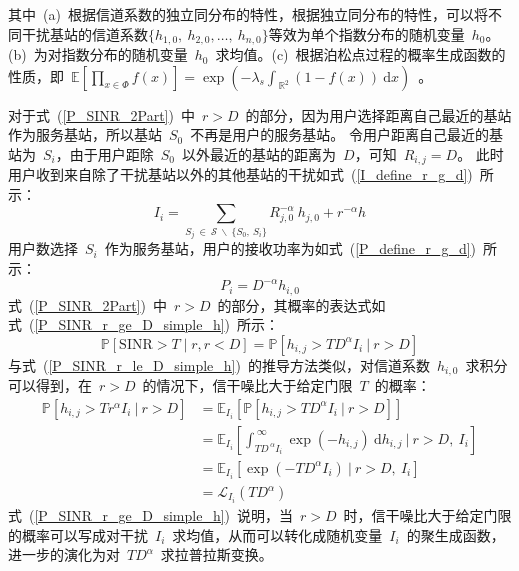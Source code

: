 其中~(a)~根据信道系数的独立同分布的特性，根据独立同分布的特性，可以将不同干扰基站的信道系数$\{h_{1,0},~h_{2,0},\dots,~h_{n,0}\}$等效为单个指数分布的随机变量~$h_0$。
(b)~为对指数分布的随机变量~$h_0$~求均值。(c)~根据泊松点过程的概率生成函数的性质，即~$\mathbb{E}\left[\prod\nolimits_{x\in\Phi}f(x)\right]=\exp(-\lambda_s\int_{~\mathbb{R}^2}(1-f(x))~\mathrm{d}x)$~。

对于式~(\ref{P_SINR_2Part})~中~$r > D$~的部分，因为用户选择距离自己最近的基站作为服务基站，所以基站~$S_0$~不再是用户的服务基站。
令用户距离自己最近的基站为~$S_i$，由于用户距除~$S_0$~以外最近的基站的距离为~$D$，可知~$R_{i,j}=D$。
此时用户收到来自除了干扰基站以外的其他基站的干扰如式~(\ref{I_define_r_g_d})~所示：
\begin{equation}\label{I_define_r_g_d}
I_i=\sum\limits_{ S_j\ \in\ {\mathcal{S}\ \backslash\ \{S_0,~S_i\}} }{R_{j,0}^{-\alpha} ~ h_{j,0}} + r^{-\alpha} h
\end{equation}
用户数选择~$S_i$~作为服务基站，用户的接收功率为如式~(\ref{P_define_r_g_d})~所示：
\begin{equation}\label{P_define_r_g_d}
  P_i = D^{-\alpha} h_{i,0}
\end{equation}
式~(\ref{P_SINR_2Part})~中~$r>D$~的部分，其概率的表达式如式~(\ref{P_SINR_r_ge_D_simple_h})~所示：
\begin{equation}\label{P_SINR_r_ge_D_simple_h}
  \mathbb{P}[\mathrm{SINR}>T \mid r, r < D] = \mathbb{P}\left[h_{i,j} > T D ^ \alpha I_i ~\big|~ r > D \right]
\end{equation}
与式~(\ref{P_SINR_r_le_D_simple_h})~的推导方法类似，对信道系数~$h_{i,0}$~求积分可以得到，在~$r>D$~的情况下，信干噪比大于给定门限~$T$~的概率：
\begin{equation}\label{P_SINR_r_ge_D_simple_h}
  \begin{aligned}
    \mathbb{P}\left[h_{i,j} > T r ^ \alpha I_i ~\bigg|~ r > D \right] & = \mathbb{E}_{I_i}\left[\mathbb{P}\left[h_{i,j} > T D ^ \alpha I_i ~\big|~ r > D\right]\right] \\
                                                                           & = \mathbb{E}_{I_i}\left[\int_{T D ^{\ \alpha} I_i}^{~\infty} \exp(-h_{i,j})~\mathrm{d} h_{i,j}~\bigg|~ r > D,~ I_i\right] \\
                                                                           & = \mathbb{E}_{I_i}\left[ \exp(-TD^\alpha I_i)~\big|~ r > D,~ I_i\right] \\
                                                                           & = \mathcal{L}_{I_i}(TD^\alpha)
  \end{aligned}
\end{equation}
式~(\ref{P_SINR_r_ge_D_simple_h})~说明，当~$r > D$~时，信干噪比大于给定门限的概率可以写成对干扰~$I_i$~求均值，从而可以转化成随机变量~$I_i$~的聚生成函数，
进一步的演化为对~$TD^\alpha$~求拉普拉斯变换。

